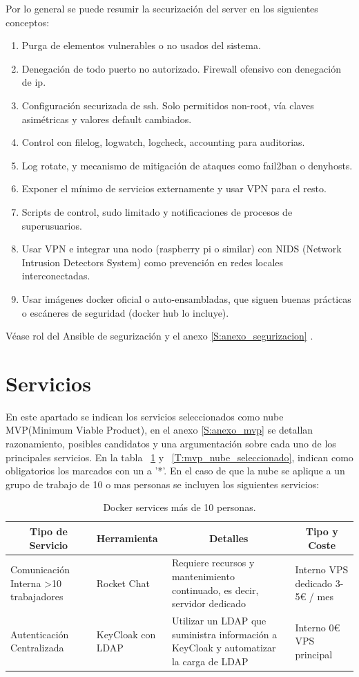 Por lo general se puede resumir la securización del server en los siguientes conceptos:
\begin{enumerate}
    \item Purga de elementos vulnerables o no usados del sistema.
    \item Denegación de todo puerto no autorizado. Firewall ofensivo con denegación de ip.
    \item Configuración securizada de ssh. Solo permitidos non-root, vía claves asimétricas y valores default cambiados.
    \item Control con filelog, logwatch, logcheck, accounting para auditorias.
    \item Log rotate, y mecanismo de mitigación de ataques como fail2ban o denyhosts.
    \item Exponer el mínimo de servicios externamente y usar VPN para el resto.
    \item Scripts de control, sudo limitado y notificaciones de procesos de superusuarios.
    \item Usar VPN e integrar una nodo (raspberry pi o similar) con NIDS (Network Intrusion Detectors System) como prevención en redes locales interconectadas.
    \item Usar imágenes docker oficial o auto-ensambladas, que siguen buenas prácticas o escáneres de seguridad (docker hub lo incluye).
\end{enumerate}

Véase rol del Ansible de segurización \cite{c_code} y el anexo \ref{S:anexo_segurizacion} .

\section{Servicios}
En este apartado se indican los servicios seleccionados como nube MVP(Minimum Viable Product), en el anexo  \ref{S:anexo_mvp} se detallan razonamiento, posibles candidatos y una argumentación sobre cada uno de los principales servicios. En la tabla ~\ref{T:mvo_mas_diez} y  ~\ref{T:mvp_nube_seleccionado}, indican como obligatorios los marcados con un a ’*’. En el caso de que la nube se aplique a un grupo de trabajo de 10 o mas personas se incluyen los siguientes servicios:
\begin{table}[!htb]
\caption{Docker services más de 10 personas.}
\label{T:mvo_mas_diez}
\begin{tabular}{|p{2cm}|p{3cm}|p{5cm}|p{2cm}|}
\hline
\multicolumn{1}{|c|}{\textbf{Tipo de Servicio}} & \textbf{Herramienta} & \multicolumn{1}{c|}{\textbf{Detalles}} & \multicolumn{1}{c|}{\textbf{Tipo y Coste}} \\ \hline
Comunicación Interna \textgreater{}10 trabajadores & Rocket Chat\cite{c_rocket_chat} & Requiere recursos y mantenimiento continuado, es decir, servidor dedicado & Interno VPS dedicado 3-5€ / mes \\ \hline
Autenticación Centralizada & KeyCloak\cite{c_keycloak} con LDAP\cite{c_ldap} & Utilizar un LDAP que suministra información a KeyCloak y automatizar la carga de LDAP & Interno 0€ VPS principal \\ \hline
\end{tabular}%
\end{table}

